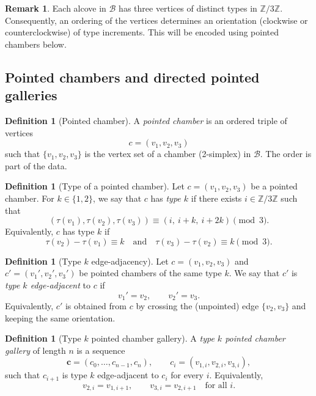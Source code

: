 \documentclass[11pt]{amsart}
\theoremstyle{definition}
\newtheorem{definition}[thm]{Definition}
\newtheorem{remark}[thm]{Remark}
\theoremstyle{remark}
\numberwithin{equation}{section}
\begin{document}
\begin{remark}\label{rem:vertex-types}
Each alcove in $\mathcal{B}$ has three vertices of distinct types in $\mathbb{Z}/3\mathbb{Z}$.
Consequently, an ordering of the vertices determines an orientation (clockwise or counterclockwise) of type increments.
This will be encoded using pointed chambers below.
\end{remark}

\subsection{Pointed chambers and directed pointed galleries}\label{subsec:pointed-chambers-galleries}

\begin{definition}[Pointed chamber]\label{def:pointed-chamber-pgl3}
A \emph{pointed chamber} is an ordered triple of vertices
\[
c=(v_1,v_2,v_3)
\]
such that $\{v_1,v_2,v_3\}$ is the vertex set of a chamber (2-simplex) in $\mathcal{B}$.
The order is part of the data.
\end{definition}

\begin{definition}[Type of a pointed chamber]\label{def:type-pointed-chamber-pgl3}
Let $c=(v_1,v_2,v_3)$ be a pointed chamber.
For $k\in\{1,2\}$, we say that $c$ has \emph{type $k$} if there exists $i\in\mathbb{Z}/3\mathbb{Z}$ such that
\[
(\tau(v_1),\tau(v_2),\tau(v_3))\equiv (i,\ i+k,\ i+2k)\pmod{3}.
\]
Equivalently, $c$ has type $k$ if
\[
\tau(v_2)-\tau(v_1)\equiv k
\quad\text{and}\quad
\tau(v_3)-\tau(v_2)\equiv k
\pmod{3}.
\]
\end{definition}

\begin{definition}[Type $k$ edge-adjacency]\label{def:type-k-edge-adjacency-pgl3}
Let $c=(v_1,v_2,v_3)$ and $c'=(v_1',v_2',v_3')$ be pointed chambers of the same type $k$.
We say that $c'$ is \emph{type $k$ edge-adjacent} to $c$ if
\[
v_1'=v_2,\qquad v_2'=v_3.
\]
Equivalently, $c'$ is obtained from $c$ by crossing the (unpointed) edge $\{v_2,v_3\}$ and keeping the same orientation.
\end{definition}

\begin{definition}[Type $k$ pointed chamber gallery]\label{def:type-k-pointed-gallery-pgl3}
A \emph{type $k$ pointed chamber gallery} of length $n$ is a sequence
\[
\mathbf{c}=(c_0,\ldots,c_{n-1},c_n),\qquad c_i=(v_{1,i},v_{2,i},v_{3,i}),
\]
such that $c_{i+1}$ is type $k$ edge-adjacent to $c_i$ for every $i$.
Equivalently,
\[
v_{2,i}=v_{1,i+1},\qquad v_{3,i}=v_{2,i+1}\quad\text{for all }i.
\]
\end{definition}
\end{document}
